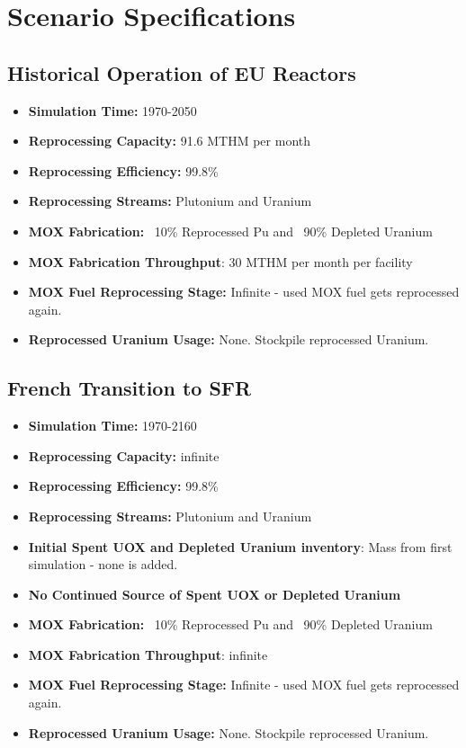 \section{Scenario Specifications}

\subsection{Historical Operation of EU Reactors}
\begin{itemize}
	\item \textbf{Simulation Time:}  1970-2050 
	\item \textbf{Reprocessing Capacity:}  91.6 MTHM per month \cite{schneider_spent_2008}  
	\item \textbf{Reprocessing Efficiency:}  99.8\%  
	\item \textbf{Reprocessing Streams:}  Plutonium and Uranium  
	\item \textbf{\gls{MOX} Fabrication:}  ~10\% Reprocessed Pu and ~90\% Depleted Uranium  
	\item \textbf{\gls{MOX} Fabrication Throughput}: 30 MTHM per month per facility \cite{hugelmann_melox_1999}
	\item \textbf{\gls{MOX} Fuel Reprocessing Stage:}  Infinite - used \gls{MOX} fuel gets reprocessed again.  
	\item\textbf{Reprocessed Uranium Usage:}  None. Stockpile reprocessed Uranium. \\
\end{itemize} 

\subsection{French Transition to \gls{SFR}}
\begin{itemize}
	\item \textbf{Simulation Time:}  1970-2160
	\item \textbf{Reprocessing Capacity:}  infinite 
	\item \textbf{Reprocessing Efficiency:}  99.8\%  
	\item \textbf{Reprocessing Streams:} Plutonium and Uranium
	\item \textbf{Initial Spent \gls{UOX} and Depleted Uranium inventory}: Mass from first simulation - none is added.
	\item \textbf{No Continued Source of Spent \gls{UOX} or Depleted Uranium}  
	\item \textbf{\gls{MOX} Fabrication:}  ~10\% Reprocessed Pu and ~90\% Depleted Uranium  
	\item \textbf{\gls{MOX} Fabrication Throughput}: infinite
	\item \textbf{\gls{MOX} Fuel Reprocessing Stage:}  Infinite - used \gls{MOX} fuel gets reprocessed again.  
	\item\textbf{Reprocessed Uranium Usage:}  None. Stockpile reprocessed Uranium. \\
\end{itemize}

